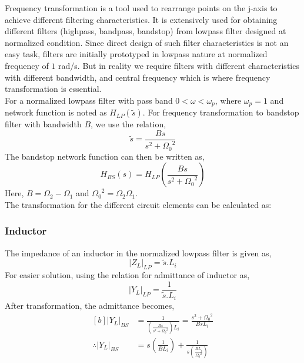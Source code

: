 Frequency transformation is a tool used to rearrange points on the j-axis to achieve different filtering characteristics. It is extensively used for obtaining different filters (highpass, bandpass, bandstop) from lowpass filter designed at normalized condition. Since direct design of such filter characteristics is not an easy task, filters are initially prototyped in lowpass nature at normalized frequency of $1$ rad/s. But in reality we require filters with different characteristics with different bandwidth, and central frequency which is where frequency transformation is essential.
\\
For a normalized lowpass filter with pass band $0<\omega<\omega_p$, where $\omega_p=1$ and network function is noted as $H_{LP}(\tilde{s})$. For frequency transformation to bandstop filter with bandwidth $B$, we use the relation,
$$
\tilde{s}=\frac{Bs}{s^2+{\Omega_0}^2}
$$
The bandstop network function can then be written as,
\begin{equation}
   H_{BS}(s)=H_{LP}\left(\frac{Bs}{s^2+{\Omega_0}^2}\right)
   \label{eqn:bs}
\end{equation}
Here, $B=\Omega_2-\Omega_1$ and ${\Omega_0}^2=\Omega_2\Omega_1$.\\
The transformation for the different circuit elements can be calculated as:
\subsubsection*{Inductor}
The impedance of an inductor in the normalized lowpass filter is given as, 
$$
|Z_L|_{LP}=\tilde{s}.L_{i}
$$
For easier solution, using the relation for admittance of inductor as,
$$
|Y_L|_{LP}=\frac{1}{\tilde{s}.L_{i}}
$$
After transformation, the admittance becomes,
\begin{equation}
   \begin{aligned}[b]
      |Y_L|_{BS}&=\frac{1}{\left(\frac{Bs}{s^2+{\Omega_0}^2}\right)L_{i}} =\frac{s^2+{\Omega_0}^2}{BsL_i}\\
       \therefore |Y_L|_{BS}&=s\left(\frac{1}{BL_i}\right)+\frac{1}{s\left(\frac{BL_i}{{\Omega_0}^2}\right)}
   \end{aligned}
   \label{eqn:l_bs}
\end{equation}

